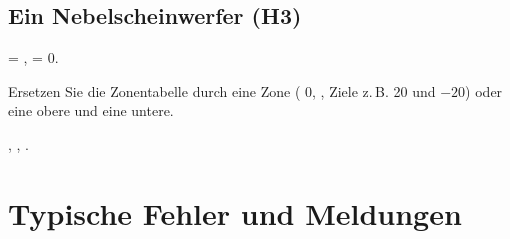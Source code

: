 \subsection{Ein Nebelscheinwerfer (H3)}

\begin{schritte}
  \item {} = ,  = 0.
  \item Ersetzen Sie die Zonentabelle durch eine Zone ( 0, ,
    Ziele z.\,B. 20 und $-20$) oder eine obere und eine untere.
  \item {}, , .
\end{schritte}

\section{Typische Fehler und Meldungen}\label{sec:al-fehler}

